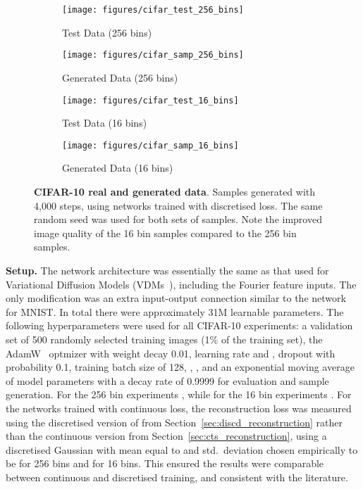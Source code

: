 \documentclass[11pt,table]{article}
\newcommand{\0}[1]{\constvec{0}{#1}}
\newcommand{\1}[1]{\constvec{1}{#1}}
\begin{document}
\begin{figure}[t!]
\centering
\begin{subfigure}{.5\textwidth}
  \centering
  \texttt{[image: figures/cifar\_test\_256\_bins]}
  \caption{Test Data (256 bins)}
\end{subfigure}\begin{subfigure}{.5\textwidth}
  \centering
  \texttt{[image: figures/cifar\_samp\_256\_bins]}
  \caption{Generated Data (256 bins)}
\end{subfigure}
\par\bigskip
\begin{subfigure}{.5\textwidth}
  \centering
  \texttt{[image: figures/cifar\_test\_16\_bins]}
  \caption{Test Data (16 bins)}
\end{subfigure}\begin{subfigure}{.5\textwidth}
  \centering 
  \texttt{[image: figures/cifar\_samp\_16\_bins]}
  \caption{Generated Data (16 bins)}
\end{subfigure}
\caption{\textbf{CIFAR-10 real and generated data}. Samples generated with 4,000 steps, using networks trained with discretised loss. The same random seed was used for both sets of samples. Note the improved image quality of the 16 bin samples compared to the 256 bin samples.}
\label{fig:cifar_samples}
\end{figure}

\noindent\textbf{Setup.}\quad 
The network architecture was essentially the same as that used for Variational Diffusion Models (VDMs~\citep{kingma2021variational}), including the Fourier feature inputs.
The only modification was an extra input-output connection similar to the network for MNIST.
In total there were approximately 31M learnable parameters.
The following hyperparameters were used for all CIFAR-10 experiments:
a validation set of 500 randomly selected training images (1\% of the training set),
the  AdamW~\citep{loshchilov2017decoupled} optmizer with weight decay 0.01, learning rate  and ,
dropout with probability 0.1,
training batch size of 128,
,
, and
an exponential moving average of model parameters with a decay rate of 0.9999 for evaluation and sample generation.
For the 256 bin experiments , while for the 16 bin experiments .
For the networks trained with continuous loss, the reconstruction loss was measured using the discretised version of  from Section~\ref{sec:discd_reconstruction} rather than the continuous version from Section~\ref{sec:cts_reconstruction}, using a discretised Gaussian with mean equal to  and std.\ deviation chosen empirically to be  for 256 bins and  for 16 bins.
This ensured the results were comparable between continuous and discretised training, and consistent with the literature.
\\
\end{document}
